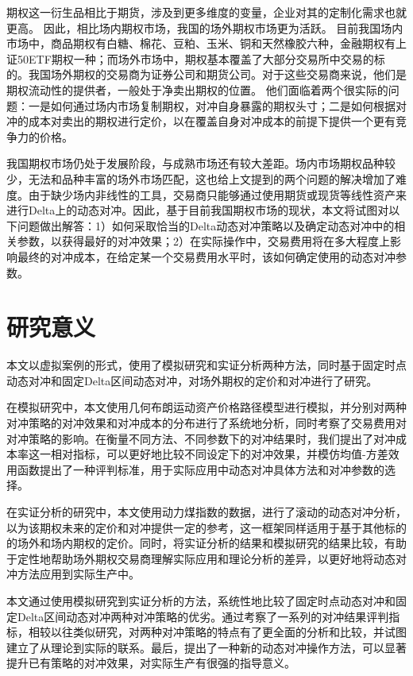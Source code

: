 期权这一衍生品相比于期货，涉及到更多维度的变量，企业对其的定制化需求也就更高。
因此，相比场内期权市场，我国的场外期权市场更为活跃。
目前我国场内市场中，商品期权有白糖、棉花、豆粕、玉米、铜和天然橡胶六种，金融期权有上证50ETF期权一种；而场外市场中，期权基本覆盖了大部分交易所中交易的标的。我国场外期权的交易商为证券公司和期货公司。对于这些交易商来说，他们是期权流动性的提供者，一般处于净卖出期权的位置。
他们面临着两个很实际的问题：一是如何通过场内市场复制期权，对冲自身暴露的期权头寸；二是如何根据对冲的成本对卖出的期权进行定价，以在覆盖自身对冲成本的前提下提供一个更有竞争力的价格。

我国期权市场仍处于发展阶段，与成熟市场还有较大差距。场内市场期权品种较少，无法和品种丰富的场外市场匹配，这也给上文提到的两个问题的解决增加了难度。由于缺少场内非线性的工具，交易商只能够通过使用期货或现货等线性资产来进行Delta上的动态对冲。因此，基于目前我国期权市场的现状，本文将试图对以下问题做出解答：1）如何采取恰当的Delta动态对冲策略以及确定动态对冲中的相关参数，以获得最好的对冲效果；2）在实际操作中，交易费用将在多大程度上影响最终的对冲成本，在给定某一个交易费用水平时，该如何确定使用的动态对冲参数。

\section{研究意义}

本文以虚拟案例的形式，使用了模拟研究和实证分析两种方法，同时基于固定时点动态对冲和固定Delta区间动态对冲，对场外期权的定价和对冲进行了研究。

在模拟研究中，本文使用几何布朗运动资产价格路径模型进行模拟，并分别对两种对冲策略的对冲效果和对冲成本的分布进行了系统地分析，同时考察了交易费用对对冲策略的影响。在衡量不同方法、不同参数下的对冲结果时，我们提出了对冲成本率这一相对指标，可以更好地比较不同设定下的对冲效果，并模仿均值-方差效用函数提出了一种评判标准，用于实际应用中动态对冲具体方法和对冲参数的选择。

在实证分析的研究中，本文使用动力煤指数的数据，进行了滚动的动态对冲分析，以为该期权未来的定价和对冲提供一定的参考，这一框架同样适用于基于其他标的的场外和场内期权的定价。同时，将实证分析的结果和模拟研究的结果比较，有助于定性地帮助场外期权交易商理解实际应用和理论分析的差异，以更好地将动态对冲方法应用到实际生产中。

本文通过使用模拟研究到实证分析的方法，系统性地比较了固定时点动态对冲和固定Delta区间动态对冲两种对冲策略的优劣。通过考察了一系列的对冲结果评判指标，相较以往类似研究，对两种对冲策略的特点有了更全面的分析和比较，并试图建立了从理论到实际的联系。最后，提出了一种新的动态对冲操作方法，可以显著提升已有策略的对冲效果，对实际生产有很强的指导意义。


